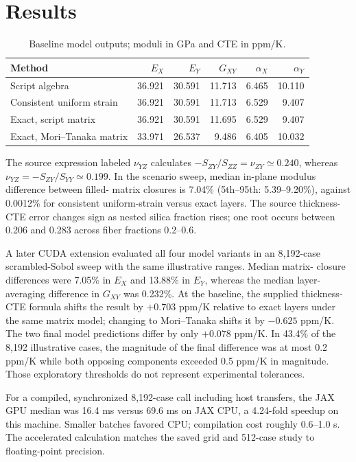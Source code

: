 \documentclass[11pt]{article}
\begin{document}
\section{Results}
\begin{table}[h]
\centering
\caption{Baseline model outputs; moduli in GPa and CTE in ppm/K.}
\begin{tabular}{lrrrrr}\toprule
Method & $E_X$ & $E_Y$ & $G_{XY}$ & $\alpha_X$ & $\alpha_Y$\\\midrule
Script algebra & 36.921 & 30.591 & 11.713 & 6.465 & 10.110\\
Consistent uniform strain & 36.921 & 30.591 & 11.713 & 6.529 & 9.407\\
Exact, script matrix & 36.921 & 30.591 & 11.695 & 6.529 & 9.407\\
Exact, Mori--Tanaka matrix & 33.971 & 26.537 & 9.486 & 6.405 & 10.032\\\bottomrule
\end{tabular}
\end{table}
The source expression labeled $\nu_{YZ}$ calculates
$-S_{ZY}/S_{ZZ}=\nu_{ZY}\simeq0.240$, whereas
$\nu_{YZ}=-S_{ZY}/S_{YY}\simeq0.199$.
In the scenario sweep, median in-plane modulus difference between filled-
matrix closures is 7.04\% (5th--95th: 5.39--9.20\%), against 0.0012\%
for consistent uniform-strain versus exact layers. The source thickness-CTE
error changes sign as nested silica fraction rises; one root occurs between
0.206 and 0.283 across fiber fractions 0.2--0.6.

A later CUDA extension evaluated all four model variants in an 8,192-case
scrambled-Sobol sweep with the same illustrative ranges. Median matrix-
closure differences were 7.05\% in $E_X$ and 13.88\% in $E_Y$, whereas
the median layer-averaging difference in $G_{XY}$ was 0.232\%. At the
baseline, the supplied thickness-CTE formula shifts the result by
$+0.703$ ppm/K relative to exact layers under the same matrix model;
changing to Mori--Tanaka shifts it by $-0.625$ ppm/K. The two final model
predictions differ by only $+0.078$ ppm/K. In 43.4\% of the 8,192
illustrative cases, the magnitude of the final difference was at most
0.2 ppm/K while both
opposing components exceeded 0.5 ppm/K in magnitude. Those exploratory
thresholds do not represent experimental tolerances.

For a compiled, synchronized 8,192-case call including host transfers,
the JAX GPU median was 16.4 ms versus 69.6 ms on JAX CPU, a 4.24-fold
speedup on this machine. Smaller batches favored CPU; compilation cost
roughly 0.6--1.0 s. The accelerated calculation matches the saved grid and
512-case study to floating-point precision.
\end{document}
